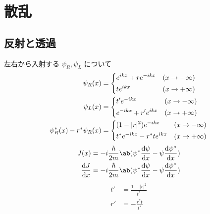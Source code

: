 \documentclass[uplatex,dvipdfmx,a4paper,11pt]{jlreq}
\numberwithin{equation}{section}
\theoremstyle{definition}
\begin{document}
\section{散乱}
\subsection{反射と透過}
左右から入射する $\psi_R, \psi_L$ について
\begin{align}
  \psi_R(x)                  & = \begin{dcases}
                                   e^{ikx} + re^{-ikx} & (x\to-\infty) \\
                                   te^{ikx}            & (x\to+\infty) \\
                                 \end{dcases}       \\
  \psi_L(x)                  & = \begin{dcases}
                                   t'e^{-ikx}           & (x\to-\infty) \\
                                   e^{-ikx} + r'e^{ikx} & (x\to+\infty) \\
                                 \end{dcases}      \\
  \psi_R^*(x) - r^*\psi_R(x) & = \begin{dcases}
                                   (1 - |r|^2)e^{-ikx}       & (x\to-\infty) \\
                                   t^*e^{-ikx} - r^*te^{ikx} & (x\to+\infty) \\
                                 \end{dcases}
\end{align}
\begin{align}
  J(x)        & = -i\frac{\hbar}{2m}\ab(\psi^*\diff{\psi}{x} - \psi\diff{\psi^*}{x}) \\
  \diff{J}{x} & = -i\frac{\hbar}{2m}\ab(\psi^*\diff{\psi}{x} - \psi\diff{\psi^*}{x})
\end{align}
\begin{align}
  t' & = \frac{1 - |r|^2}{t^*} \\
  r' & = -\frac{r^*t}{t^*}
\end{align}
\end{document}
